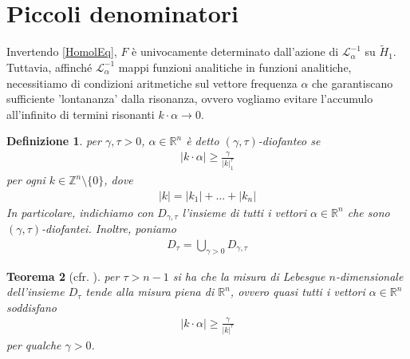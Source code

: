 \documentclass[twoside, 11pt]{amsbook}
\newcommand{\0}{{(0)}}
\newcommand{\3}{{(3)}}
\theoremstyle{colonplain}
\newtheorem{thm}{Teorema}[chapter]
\theoremstyle{colondefinition}
\newtheorem{defn}[thm]{Definizione}
\theoremstyle{colonremark}
\numberwithin{equation}{chapter}
\begin{document}
\section{Piccoli denominatori}
Invertendo \eqref{HomolEq}, $F$ è univocamente determinato dall'azione di $\mathcal{L}^{-1}_\alpha$ su $\tilde{H}_1$. Tuttavia, affinché $\mathcal{L}^{-1}_\alpha$ mappi funzioni analitiche in funzioni analitiche, necessitiamo di condizioni aritmetiche sul vettore frequenza $\alpha$ che garantiscano sufficiente 'lontananza' dalla risonanza, ovvero vogliamo evitare l'accumulo all'infinito di termini risonanti $k \cdot \alpha \rightarrow 0$.
\begin{defn} per $\gamma, \tau > 0$, $\alpha \in \mathbb{R}^n$ è detto $(\gamma, \tau)$-\textit{diofanteo} se 
\begin{align}
    |k \cdot \alpha| \geq \frac{\gamma}{|k|^\tau_1}
\end{align}
per ogni $k \in \mathbb{Z}^n \setminus \{0\}$, dove
\begin{align}
    |k| = |k_1| + \dots + |k_n|
\end{align}
In particolare, indichiamo con $D_{\gamma, \tau}$ l'insieme di tutti i vettori $\alpha \in \mathbb{R}^n$ che sono $(\gamma, \tau)$-diofantei. Inoltre, poniamo
\begin{align}\label{Diofant}
    D_\tau = \bigcup_{\gamma > 0}D_{\gamma, \tau}
\end{align}
\end{defn}
\begin{thm}[cfr. \cite{Poschel}] per $\tau > n - 1$ si ha che la misura di Lebesgue $n$-dimensionale dell'insieme $D_\tau$ tende alla misura piena di $\mathbb{R}^n$, ovvero quasi tutti i vettori $\alpha \in \mathbb{R}^n$ soddisfano
\begin{align}
    |k \cdot \alpha| \geq \frac{\gamma}{|k|^\tau}
\end{align}
per qualche $\gamma > 0$.
\end{thm}
\end{document}
